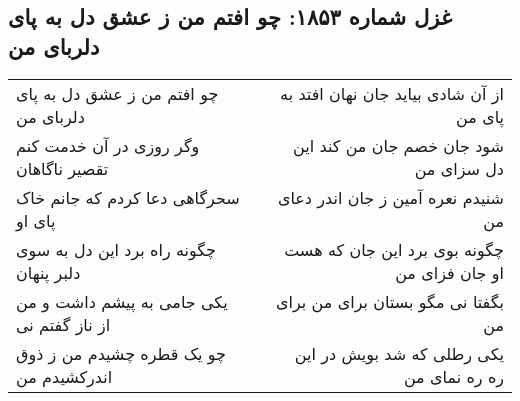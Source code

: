 \begin{center}
\section*{غزل شماره ۱۸۵۳: چو افتم من ز عشق دل به پای دلربای من}
\label{sec:1853}
\begin{longtable}{l p{0.5cm} r}
چو افتم من ز عشق دل به پای دلربای من
&&
از آن شادی بیاید جان نهان افتد به پای من
\\
وگر روزی در آن خدمت کنم تقصیر ناگاهان
&&
شود جان خصم جان من کند این دل سزای من
\\
سحرگاهی دعا کردم که جانم خاک پای او
&&
شنیدم نعره آمین ز جان اندر دعای من
\\
چگونه راه برد این دل به سوی دلبر پنهان
&&
چگونه بوی برد این جان که هست او جان فزای من
\\
یکی جامی به پیشم داشت و من از ناز گفتم نی
&&
بگفتا نی مگو بستان برای من برای من
\\
چو یک قطره چشیدم من ز ذوق اندرکشیدم من
&&
یکی رطلی که شد بویش در این ره ره نمای من
\\
\end{longtable}
\end{center}
